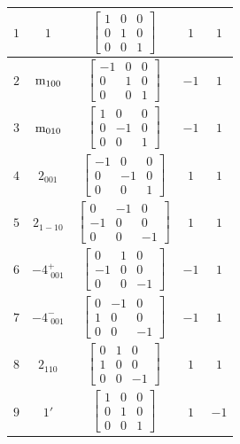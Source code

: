 \documentclass[fleqn,8pt]{jsarticle}
\begin{document}
\begin{longtable}{ccccc}
$ 1 $ & $ 1 $ & $ \begin{bmatrix} 1 & 0 & 0 \\ 0 & 1 & 0 \\ 0 & 0 & 1 \end{bmatrix} $ & $ 1 $ & $ 1 $ \\ \hline
$ 2 $ & $ {\rm m}_{100} $ & $ \begin{bmatrix} -1 & 0 & 0 \\ 0 & 1 & 0 \\ 0 & 0 & 1 \end{bmatrix} $ & $ -1 $ & $ 1 $ \\ \hline
$ 3 $ & $ {\rm m}_{010} $ & $ \begin{bmatrix} 1 & 0 & 0 \\ 0 & -1 & 0 \\ 0 & 0 & 1 \end{bmatrix} $ & $ -1 $ & $ 1 $ \\ \hline
$ 4 $ & $ 2{}_{001} $ & $ \begin{bmatrix} -1 & 0 & 0 \\ 0 & -1 & 0 \\ 0 & 0 & 1 \end{bmatrix} $ & $ 1 $ & $ 1 $ \\ \hline
$ 5 $ & $ 2{}_{1-10} $ & $ \begin{bmatrix} 0 & -1 & 0 \\ -1 & 0 & 0 \\ 0 & 0 & -1 \end{bmatrix} $ & $ 1 $ & $ 1 $ \\ \hline
$ 6 $ & $ -4^{+}_{\,\,001} $ & $ \begin{bmatrix} 0 & 1 & 0 \\ -1 & 0 & 0 \\ 0 & 0 & -1 \end{bmatrix} $ & $ -1 $ & $ 1 $ \\ \hline
$ 7 $ & $ -4^{-}_{\,\,001} $ & $ \begin{bmatrix} 0 & -1 & 0 \\ 1 & 0 & 0 \\ 0 & 0 & -1 \end{bmatrix} $ & $ -1 $ & $ 1 $ \\ \hline
$ 8 $ & $ 2{}_{110} $ & $ \begin{bmatrix} 0 & 1 & 0 \\ 1 & 0 & 0 \\ 0 & 0 & -1 \end{bmatrix} $ & $ 1 $ & $ 1 $ \\ \hline
$ 9 $ & $ 1{}' $ & $ \begin{bmatrix} 1 & 0 & 0 \\ 0 & 1 & 0 \\ 0 & 0 & 1 \end{bmatrix} $ & $ 1 $ & $ -1 $ \\ \hline

\end{longtable}
\end{document}
